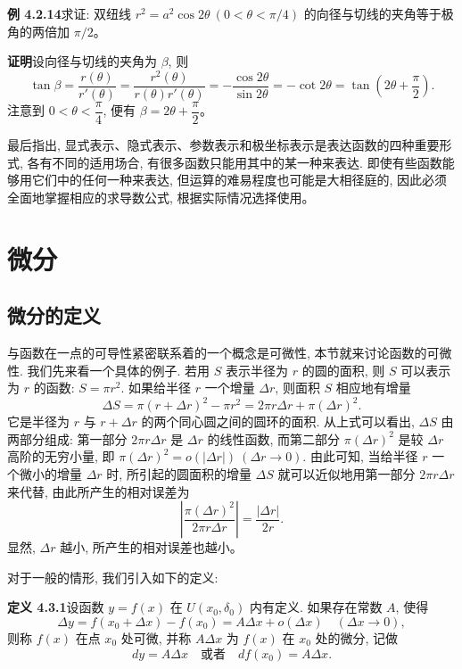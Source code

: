 \documentclass[UTF8, 12pt, fontset=fandol, oneside]{ctexart}
\begin{document}
\noindent\textbf{例 4.2.14}\quad 求证: 双纽线 $r^2=a^2\cos2\theta\ (0<\theta<\pi/4)$ 的向径与切线的夹角等于极角的两倍加 $\pi/2$。

\noindent\textbf{证明}\quad 设向径与切线的夹角为 $\beta$, 则
\[
  \tan\beta
  =
  \frac{r(\theta)}{r'(\theta)}
  =
  \frac{r^2(\theta)}{r(\theta)r'(\theta)}
  =
  -\frac{\cos2\theta}{\sin2\theta}
  =
  -\cot2\theta
  =
  \tan\left(2\theta+\frac{\pi}{2}\right).
\]
注意到 $0<\theta<\dfrac{\pi}{4}$, 便有 $\beta=2\theta+\dfrac{\pi}{2}$。

最后指出, 显式表示、隐式表示、参数表示和极坐标表示是表达函数的四种重要形式, 各有不同的适用场合, 有很多函数只能用其中的某一种来表达. 即使有些函数能够用它们中的任何一种来表达, 但运算的难易程度也可能是大相径庭的, 因此必须全面地掌握相应的求导数公式, 根据实际情况选择使用。

\section{微分}

\subsection{微分的定义}

与函数在一点的可导性紧密联系着的一个概念是可微性, 本节就来讨论函数的可微性. 我们先来看一个具体的例子. 若用 $S$ 表示半径为 $r$ 的圆的面积, 则 $S$ 可以表示为 $r$ 的函数: $S=\pi r^2$. 如果给半径 $r$ 一个增量 $\Delta r$, 则面积 $S$ 相应地有增量
\[
  \Delta S
  =
  \pi(r+\Delta r)^2-\pi r^2
  =
  2\pi r\Delta r+\pi(\Delta r)^2.
\]
它是半径为 $r$ 与 $r+\Delta r$ 的两个同心圆之间的圆环的面积. 从上式可以看出, $\Delta S$ 由两部分组成: 第一部分 $2\pi r\Delta r$ 是 $\Delta r$ 的线性函数, 而第二部分 $\pi(\Delta r)^2$ 是较 $\Delta r$ 高阶的无穷小量, 即 $\pi(\Delta r)^2=o(|\Delta r|)\ (\Delta r\to0)$. 由此可知, 当给半径 $r$ 一个微小的增量 $\Delta r$ 时, 所引起的圆面积的增量 $\Delta S$ 就可以近似地用第一部分 $2\pi r\Delta r$ 来代替, 由此所产生的相对误差为
\[
  \left|\frac{\pi(\Delta r)^2}{2\pi r\Delta r}\right|
  =
  \frac{|\Delta r|}{2r}.
\]
显然, $\Delta r$ 越小, 所产生的相对误差也越小。

对于一般的情形, 我们引入如下的定义:

\noindent\textbf{定义 4.3.1}\quad 设函数 $y=f(x)$ 在 $U(x_0,\delta_0)$ 内有定义. 如果存在常数 $A$, 使得
\[
  \Delta y=f(x_0+\Delta x)-f(x_0)=A\Delta x+o(\Delta x)
  \quad(\Delta x\to0),
\]
则称 $f(x)$ 在点 $x_0$ 处可微, 并称 $A\Delta x$ 为 $f(x)$ 在 $x_0$ 处的微分, 记做
\[
  dy=A\Delta x\quad\text{或者}\quad df(x_0)=A\Delta x.
\]
\end{document}
